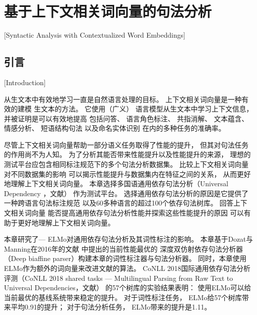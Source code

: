 \chapter{基于上下文相关词向量的句法分析}[Syntactic Analysis with Contextualized Word Embeddings]\label{chp:seqlabel}

\section{引言}[Introduction]

从生文本中有效地学习一直是自然语言处理的目标。
上下文相关词向量\cite{NIPS2017_7209,peters-EtAl:2018:N18-1,DBLP:journals/corr/abs-1810-04805,akbik-blythe-vollgraf:2018:C18-1,P18-1031}是一种有效的建模
生文本的方法。
它使用（广义）
语言模型从生文本中学习上下文信息，并被证明是可以有效地提高
包括问答\cite{peters-EtAl:2018:N18-1,DBLP:journals/corr/abs-1810-04805}、
语言角色标注\cite{peters-EtAl:2018:N18-1}、
共指消解\cite{lee-etal-2018-higher}、
文本蕴含\cite{peters-EtAl:2018:N18-1,DBLP:journals/corr/abs-1810-04805}、
情感分析\cite{peters-EtAl:2018:N18-1}、
短语结构句法\cite{P18-1249,joshi-peters-hopkins:2018:Long}
以及命名实体识别\cite{peters-EtAl:2017:Long,DBLP:journals/corr/abs-1810-04805}
在内的多种任务的准确率\cite{peters-EtAl:2018:EMNLP}。

尽管上下文相关词向量帮助一部分语义任务取得了性能的提升，
但其对句法任务的作用尚不为人知。
为了分析其能否带来性能提升以及性能提升的来源，
理想的测试平台应包含相同标注规范下的多个句法分析数据集。 
比较上下文相关词向量对不同数据集的影响
可以揭示性能提升与数据集内在特征之间的关系，
从而更好地理解上下文相关词向量。 
本章选择多国语通用依存句法分析（Universal Dependency ，文献）
作为测试平台。
选择通用依存句法分析的原因是它提供了一种跨语言句法标注规范
以及60多种语言的超过100个依存句法树库。
回答上下文相关词向量
能否提高通用依存句法分析性能并探索这些性能提升的原因
可以有助于更好地理解上下文相关词向量。

本章研究了\elmochinesetranslation --- ELMo\cite{peters-EtAl:2018:N18-1}对通用依存句法分析及其词性标注的影响。
本章基于Dozat与Manning在2016年的文献
中提出的当前性能最优的
深度双仿射依存句法分析器（Deep biaffine parser）构建本章的词性标注器与句法分析器。
同时，本章使用ELMo作为额外的词向量来改进文献的算法。 
CoNLL 2018国际通用依存句法分析评测（CoNLL 2018 shared tasks --- Multilingual Parsing from Raw Text to Universal Dependencies，文献）
的57个树库的实验结果表明：
使用ELMo可以给当前最优的基线系统带来稳定的提升。
对于词性标注任务，
ELMo给57个树库带来平均0.91的提升；
对于句法分析任务，
ELMo带来的提升是1.11。

